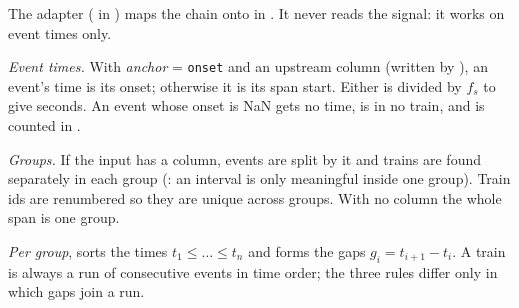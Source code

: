 The adapter ( in ) maps the chain onto
 in . It never reads the signal: it
works on event times only.

\emph{Event times.} With \emph{anchor} = \texttt{onset} and an upstream 
column (written by ), an event's time is its onset;
otherwise it is its span start. Either is divided by $f_s$ to give seconds. An event whose
onset is NaN gets no time, is in no train, and is counted in .

\emph{Groups.} If the input has a  column, events are split by it and trains are
found separately in each group (: an interval is only
meaningful inside one group). Train ids are renumbered so they are unique across groups. With
no  column the whole span is one group.

\emph{Per group},  sorts the times $t_1 \le \dots \le t_n$ and forms the
gaps $g_i = t_{i+1} - t_i$. A train is always a run of consecutive events in time order; the
three rules differ only in which gaps join a run.

